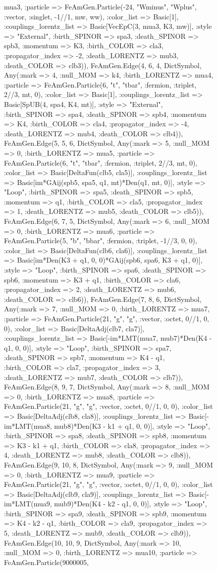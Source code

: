 \documentclass{revtex4}
\begin{document}
\begin{figure}[!htb]
\begin{center}
{mua3, :particle => FeAmGen.Particle(-24, "Wminus", "Wplus", :vector, :singlet, -1//1, mw, ww), :color_list => Basic[1], :couplings_lorentz_list => Basic[VecEpC(3, mua3, K3, mw)], :style => "External", :birth_SPINOR => spa3, :death_SPINOR => spb3, :momentum => K3, :birth_COLOR => cla3, :propagator_index => -2, :death_LORENTZ => mub3, :death_COLOR => clb3)), FeAmGen.Edge(4, 6, 4, Dict{Symbol, Any}(:mark => 4, :null_MOM => k4, :birth_LORENTZ => mua4, :particle => FeAmGen.Particle(6, "t", "tbar", :fermion, :triplet, 2//3, mt, 0), :color_list => Basic[1], :couplings_lorentz_list => Basic[SpUB(4, spa4, K4, mt)], :style => "External", :birth_SPINOR => spa4, :death_SPINOR => spb4, :momentum => K4, :birth_COLOR => cla4, :propagator_index => -4, :death_LORENTZ => mub4, :death_COLOR => clb4)), FeAmGen.Edge(5, 5, 6, Dict{Symbol, Any}(:mark => 5, :null_MOM => 0, :birth_LORENTZ => mua5, :particle => FeAmGen.Particle(6, "t", "tbar", :fermion, :triplet, 2//3, mt, 0), :color_list => Basic[DeltaFun(clb5, cla5)], :couplings_lorentz_list => Basic[im*GAij(spb5, spa5, q1, mt)*Den(q1, mt, 0)], :style => "Loop", :birth_SPINOR => spa5, :death_SPINOR => spb5, :momentum => q1, :birth_COLOR => cla5, :propagator_index => 1, :death_LORENTZ => mub5, :death_COLOR => clb5)), FeAmGen.Edge(6, 7, 5, Dict{Symbol, Any}(:mark => 6, :null_MOM => 0, :birth_LORENTZ => mua6, :particle => FeAmGen.Particle(5, "b", "bbar", :fermion, :triplet, -1//3, 0, 0), :color_list => Basic[DeltaFun(clb6, cla6)], :couplings_lorentz_list => Basic[im*Den(K3 + q1, 0, 0)*GAij(spb6, spa6, K3 + q1, 0)], :style => "Loop", :birth_SPINOR => spa6, :death_SPINOR => spb6, :momentum => K3 + q1, :birth_COLOR => cla6, :propagator_index => 2, :death_LORENTZ => mub6, :death_COLOR => clb6)), FeAmGen.Edge(7, 8, 6, Dict{Symbol, Any}(:mark => 7, :null_MOM => 0, :birth_LORENTZ => mua7, :particle => FeAmGen.Particle(21, "g", "g", :vector, :octet, 0//1, 0, 0), :color_list => Basic[DeltaAdj(clb7, cla7)], :couplings_lorentz_list => Basic[-im*LMT(mua7, mub7)*Den(K4 - q1, 0, 0)], :style => "Loop", :birth_SPINOR => spa7, :death_SPINOR => spb7, :momentum => K4 - q1, :birth_COLOR => cla7, :propagator_index => 3, :death_LORENTZ => mub7, :death_COLOR => clb7)), FeAmGen.Edge(8, 9, 7, Dict{Symbol, Any}(:mark => 8, :null_MOM => 0, :birth_LORENTZ => mua8, :particle => FeAmGen.Particle(21, "g", "g", :vector, :octet, 0//1, 0, 0), :color_list => Basic[DeltaAdj(clb8, cla8)], :couplings_lorentz_list => Basic[-im*LMT(mua8, mub8)*Den(K3 - k1 + q1, 0, 0)], :style => "Loop", :birth_SPINOR => spa8, :death_SPINOR => spb8, :momentum => K3 - k1 + q1, :birth_COLOR => cla8, :propagator_index => 4, :death_LORENTZ => mub8, :death_COLOR => clb8)), FeAmGen.Edge(9, 10, 8, Dict{Symbol, Any}(:mark => 9, :null_MOM => 0, :birth_LORENTZ => mua9, :particle => FeAmGen.Particle(21, "g", "g", :vector, :octet, 0//1, 0, 0), :color_list => Basic[DeltaAdj(clb9, cla9)], :couplings_lorentz_list => Basic[-im*LMT(mua9, mub9)*Den(K4 - k2 - q1, 0, 0)], :style => "Loop", :birth_SPINOR => spa9, :death_SPINOR => spb9, :momentum => K4 - k2 - q1, :birth_COLOR => cla9, :propagator_index => 5, :death_LORENTZ => mub9, :death_COLOR => clb9)), FeAmGen.Edge(10, 10, 9, Dict{Symbol, Any}(:mark => 10, :null_MOM => 0, :birth_LORENTZ => mua10, :particle => FeAmGen.Particle(9000005, }
\end{center}
\end{figure}
\end{document}
